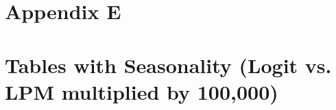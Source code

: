






\clearpage
\pagebreak

\section*{Appendix E}
\vspace{3.0in}

\section*{Tables with Seasonality (Logit vs. LPM multiplied by 100,000)}

\vfill
\eject















